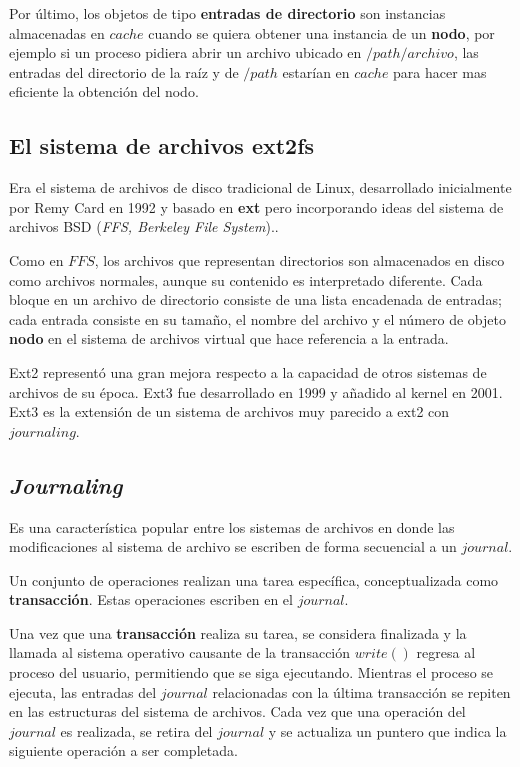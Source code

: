 \documentclass[spanish]{article}
\begin{document}
Por \'{u}ltimo, los objetos de tipo \textbf{entradas de directorio} son instancias almacenadas en $cache$ cuando se quiera obtener una instancia de un \textbf{nodo}, por ejemplo si un proceso pidiera abrir un archivo ubicado en $/path/archivo$, las entradas del directorio de la raíz y de $/path$ estar\'{i}an en $cache$ para hacer mas eficiente la obtención del nodo.

\subsection{El sistema de archivos \textbf{ext2fs}}

Era el sistema de archivos de disco tradicional de Linux, desarrollado inicialmente por Remy Card en 1992 y basado en \textbf{ext} pero incorporando ideas del sistema de archivos BSD (\textit{FFS, Berkeley File System}).\cite{ext2fs-definition}.

Como en $FFS$, los archivos que representan directorios son almacenados en disco como archivos normales, aunque su contenido es interpretado diferente. Cada bloque en un archivo de directorio consiste de una lista encadenada de entradas; cada entrada consiste en su tamaño, el nombre del archivo y el número de objeto \textbf{nodo} en el sistema de archivos virtual que hace referencia a la entrada.

Ext2 representó una gran mejora respecto a la capacidad de otros sistemas de archivos de su época. Ext3 fue desarrollado en 1999 y añadido al kernel en 2001. Ext3 es la extensión de un sistema de archivos muy parecido a ext2 con $journaling$.

\subsection{\textit{Journaling}}

Es una característica popular entre los sistemas de archivos en donde las modificaciones al sistema de archivo se escriben de forma secuencial a un $journal$. 

Un conjunto de operaciones realizan una tarea específica, conceptualizada como \textbf{transacción}. Estas operaciones escriben en el $journal$. 

Una vez que una \textbf{transacción} realiza su tarea, se considera finalizada y la llamada al sistema operativo causante de la transacción $write()$ regresa al proceso del usuario, permitiendo que se siga ejecutando. Mientras el proceso se ejecuta, las entradas del $journal$ relacionadas con la última transacción se repiten en las estructuras del sistema de archivos. Cada vez que una operación del $journal$ es realizada, se retira del $journal$ y se actualiza un puntero que indica la siguiente operación a ser completada.
\end{document}
